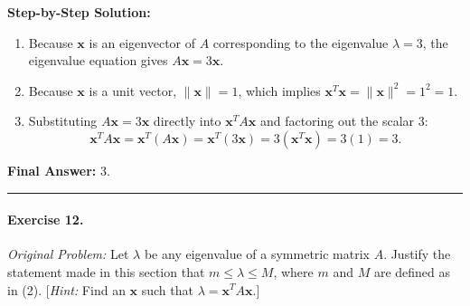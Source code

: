 \documentclass[11pt, letterpaper]{article}
\theoremstyle{definition}
\theoremstyle{remark}
\begin{document}
\textbf{Step-by-Step Solution:}
\begin{enumerate}[leftmargin=2em]
    \item Because $\mathbf{x}$ is an eigenvector of $A$ corresponding to the eigenvalue $\lambda = 3$, the eigenvalue equation gives $A\mathbf{x} = 3\mathbf{x}$.
    \item Because $\mathbf{x}$ is a unit vector, $\|\mathbf{x}\| = 1$, which implies $\mathbf{x}^T \mathbf{x} = \|\mathbf{x}\|^2 = 1^2 = 1$.
    \item Substituting $A\mathbf{x} = 3\mathbf{x}$ directly into $\mathbf{x}^T A \mathbf{x}$ and factoring out the scalar $3$:
    \[
    \mathbf{x}^T A \mathbf{x} = \mathbf{x}^T (A\mathbf{x}) = \mathbf{x}^T (3\mathbf{x}) = 3(\mathbf{x}^T \mathbf{x}) = 3(1) = 3.
    \]
\end{enumerate}
\textbf{Final Answer:} $3$.

\medskip
\hrule
\medskip

\paragraph{Exercise 12.}
\emph{Original Problem:} Let $\lambda$ be any eigenvalue of a symmetric matrix $A$. Justify the statement made in this section that $m \le \lambda \le M$, where $m$ and $M$ are defined as in (2). [\emph{Hint:} Find an $\mathbf{x}$ such that $\lambda = \mathbf{x}^T A \mathbf{x}$.]
\end{document}
